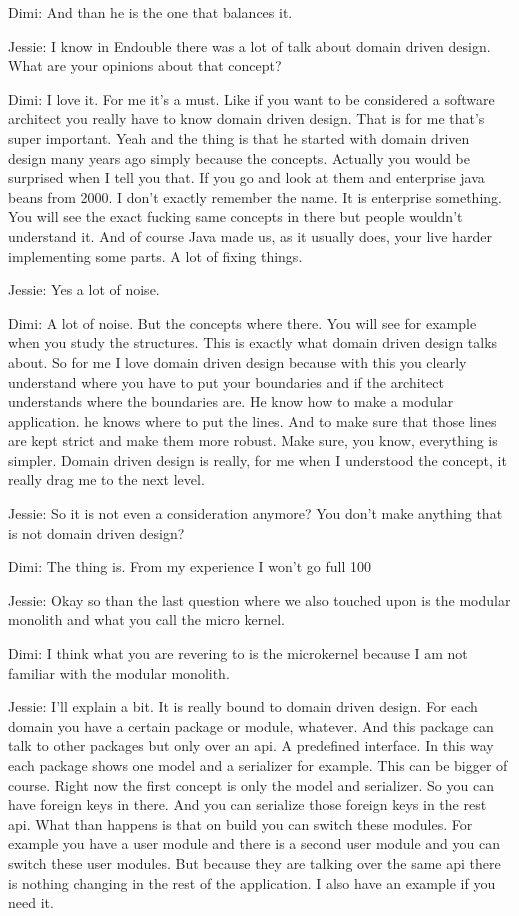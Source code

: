 Dimi: And than he is the one that balances it.

Jessie: I know in Endouble there was a lot of talk about domain driven design. What are your opinions about that concept?

Dimi: I love it. For me it's a must. Like if you want to be considered a software architect you really have to know domain driven design. That is for me that's super important. Yeah and the thing is that he started with domain driven design many years ago simply because the concepts. Actually you would be surprised when I tell you that. If you go and look at them and enterprise java beans from 2000. I don't exactly remember the name. It is enterprise something. You will see the exact fucking same concepts in there but people wouldn't understand it. And of course Java made us, as it usually does, your live harder implementing some parts. A lot of fixing things.

Jessie: Yes a lot of noise.

Dimi: A lot of noise. But the concepts where there. You will see for example when you study the structures. This is exactly what domain driven design talks about. So for me I love domain driven design because with this you clearly understand where you have to put your boundaries and if the architect understands where the boundaries are. He know how to make a modular application. he knows where to put the lines. And to make sure that those lines are kept strict and make them more robust. Make sure, you know, everything is simpler. Domain driven design is really, for me when I understood the concept, it really drag me to the next level.

Jessie: So it is not even a consideration anymore? You don't make anything that is not domain driven design?

Dimi: The thing is. From my experience I won't go full 100%

Jessie: Okay so than the last question where we also touched upon is the modular monolith and what you call the micro kernel.

Dimi: I think what you are revering to is the microkernel because I am not familiar with the modular monolith.

Jessie: I'll explain a bit. It is really bound to domain driven design. For each domain you have a certain package or module, whatever. And this package can talk to other packages but only over an api. A predefined interface. In this way each package shows one model and a serializer for example. This can be bigger of course. Right now the first concept is only the model and serializer. So you can have foreign keys in there. And you can serialize those foreign keys in the rest api. What than happens is that on build you can switch these modules. For example you have a user module and there is a second user module and you can switch these user modules. But because they are talking over the same api there is nothing changing in the rest of the application. I also have an example if you need it.

